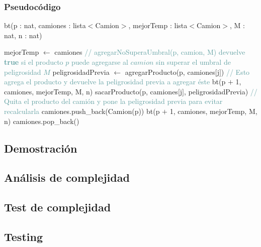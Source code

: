 \subsubsection{Pseudoc\'odigo}
\begin{algorithm}[H]
\begin{algorithmic}[1]
\caption{bt(p : nat, camiones : lista$<$Camion$>$, mejorTemp : lista$<$Camion$>$, M : nat, n : nat)}
	\STATE mejorTemp $\leftarrow$ camiones
    \RETURN
\ENDIF
{}
	\RETURN
\ENDIF
{}
	\STATE \textcolor{CadetBlue}{// agregarNoSuperaUmbral(p, camion, M) devuelve \textbf{true} si el producto $p$ puede agregarse al $camion$ sin superar el umbral de peligrosidad $M$}
		\STATE peligrosidadPrevia $\leftarrow$ agregarProducto(p, camiones$[$j$]$) \textcolor{CadetBlue}{// Esto agrega el producto y devuelve la peligrosidad previa a agregar éste}
		\STATE bt(p $+$ 1, camiones, mejorTemp, M, n)
		\STATE sacarProducto(p, camiones$[$j$]$, peligrosidadPrevia) \textcolor{CadetBlue}{// Quita el producto del camión y pone la peligrosidad previa para evitar recalcularla}
	\ENDIF
\ENDFOR
{}
	\STATE camiones.push\_back(Camion(p))
	\STATE bt(p $+$ 1, camiones, mejorTemp, M, n)
	\STATE camiones.pop\_back()
\ENDIF
\RETURN
\end{algorithmic}
\end{algorithm}

\subsection{Demostraci\'on} %

\subsection{An\'alisis de complejidad}

\subsection{Test de complejidad}

\subsection{Testing}
